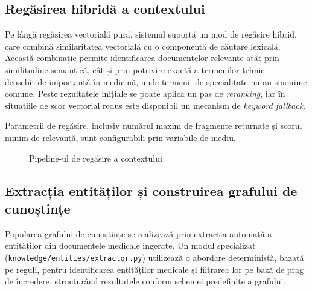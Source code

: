 \documentclass[12pt, a4paper, oneside, romanian]{teza-upb}
\begin{document}
\subsection{Regăsirea hibridă a contextului}

Pe lângă regăsirea vectorială pură, sistemul suportă un mod de regăsire hibrid, care combină similaritatea vectorială cu o componentă de căutare lexicală. Această combinație permite identificarea documentelor relevante atât prin similitudine semantică, cât și prin potrivire exactă a termenilor tehnici — deosebit de importantă în medicină, unde termenii de specialitate nu au sinonime comune. Peste rezultatele inițiale se poate aplica un pas de \textit{reranking}, iar în situațiile de scor vectorial redus este disponibil un mecanism de \textit{keyword fallback}.

Parametrii de regăsire, inclusiv numărul maxim de fragmente returnate și scorul minim de relevanță, sunt configurabili prin variabile de mediu.

\begin{figure}[H]
\centering
{}
\caption{Pipeline-ul de regăsire a contextului}
\label{fig:rag-retrieval}
\end{figure}


\subsection{Extracția entităților și construirea grafului de cunoștințe}

Popularea grafului de cunoștințe se realizează prin extracția automată a entităților din documentele medicale ingerate. Un modul specializat (\texttt{knowledge/entities/extractor.py}) utilizează o abordare deterministă, bazată pe reguli, pentru identificarea entităților medicale și filtrarea lor pe bază de prag de încredere, structurând rezultatele conform schemei predefinite a grafului.
\end{document}
